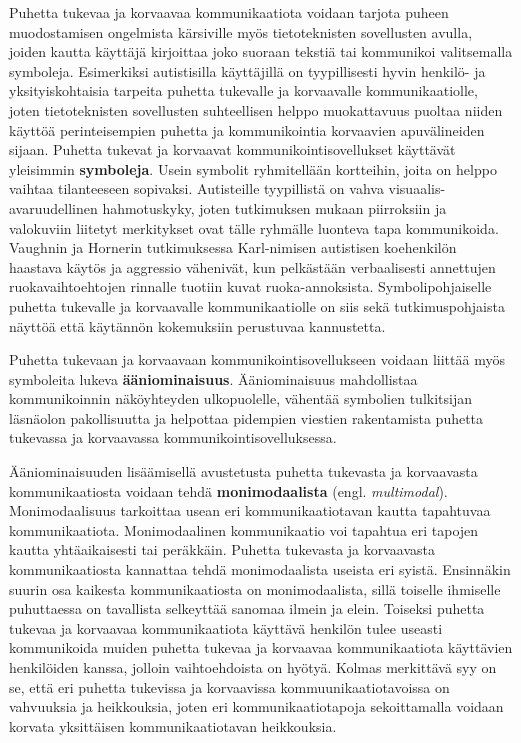 \documentclass[utf8]{gradu3}
\begin{document}
Puhetta tukevaa ja korvaavaa kommunikaatiota voidaan tarjota puheen muodostamisen ongelmista kärsiville myös tietoteknisten sovellusten avulla, joiden kautta käyttäjä kirjoittaa joko suoraan tekstiä tai kommunikoi valitsemalla symboleja. Esimerkiksi autistisilla käyttäjillä on tyypillisesti hyvin henkilö- ja yksityiskohtaisia tarpeita puhetta tukevalle ja korvaavalle kommunikaatiolle, joten tietoteknisten sovellusten suhteellisen helppo muokattavuus puoltaa niiden käyttöä perinteisempien puhetta ja kommunikointia korvaavien apuvälineiden sijaan.
\label{AAC-symbols}
Puhetta tukevat ja korvaavat kommunikointisovellukset käyttävät yleisimmin \textbf{symboleja}. Usein symbolit ryhmitellään kortteihin, joita on helppo vaihtaa tilanteeseen sopivaksi\label{AAC-cards}. Autisteille tyypillistä on vahva visuaalis-avaruudellinen hahmotuskyky, joten tutkimuksen mukaan piirroksiin ja valokuviin liitetyt merkitykset ovat tälle ryhmälle luonteva tapa kommunikoida. Vaughnin ja Hornerin tutkimuksessa \parencite[]{concrete-versus-verbal} Karl-nimisen autistisen koehenkilön haastava käytös ja aggressio vähenivät, kun pelkästään verbaalisesti annettujen ruokavaihtoehtojen rinnalle tuotiin kuvat ruoka-annoksista. Symbolipohjaiselle puhetta tukevalle ja korvaavalle kommunikaatiolle on siis sekä tutkimuspohjaista näyttöä että käytännön kokemuksiin perustuvaa kannustetta.

Puhetta tukevaan ja korvaavaan kommunikointisovellukseen voidaan liittää myös symboleita lukeva \textbf{ääniominaisuus}. Ääniominaisuus mahdollistaa kommunikoinnin näköyhteyden ulkopuolelle, vähentää symbolien tulkitsijan läsnäolon pakollisuutta ja helpottaa pidempien viestien rakentamista puhetta tukevassa ja korvaavassa kommunikointisovelluksessa. \parencite[]{AAC-interventions}

Ääniominaisuuden lisäämisellä avustetusta puhetta tukevasta ja korvaavasta kommunikaatiosta voidaan tehdä \textbf{monimodaalista} (engl. \textit{multimodal}). Monimodaalisuus tarkoittaa usean eri kommunikaatiotavan kautta tapahtuvaa kommunikaatiota. Monimodaalinen kommunikaatio voi tapahtua eri tapojen kautta yhtäaikaisesti tai peräkkäin. Puhetta tukevasta ja korvaavasta kommunikaatiosta kannattaa tehdä monimodaalista useista eri syistä. Ensinnäkin suurin osa kaikesta kommunikaatiosta on monimodaalista, sillä toiselle ihmiselle puhuttaessa on tavallista selkeyttää sanomaa ilmein ja elein. Toiseksi puhetta tukevaa ja korvaavaa kommunikaatiota käyttävä henkilön tulee useasti kommunikoida muiden puhetta tukevaa ja korvaavaa kommunikaatiota käyttävien henkilöiden kanssa, jolloin vaihtoehdoista on hyötyä. Kolmas merkittävä syy on se, että eri puhetta tukevissa ja korvaavissa kommuunikaatiotavoissa on vahvuuksia ja heikkouksia, joten eri kommunikaatiotapoja sekoittamalla voidaan korvata yksittäisen kommunikaatiotavan heikkouksia. \parencite[]{AAC-conditional-use}
\end{document}
